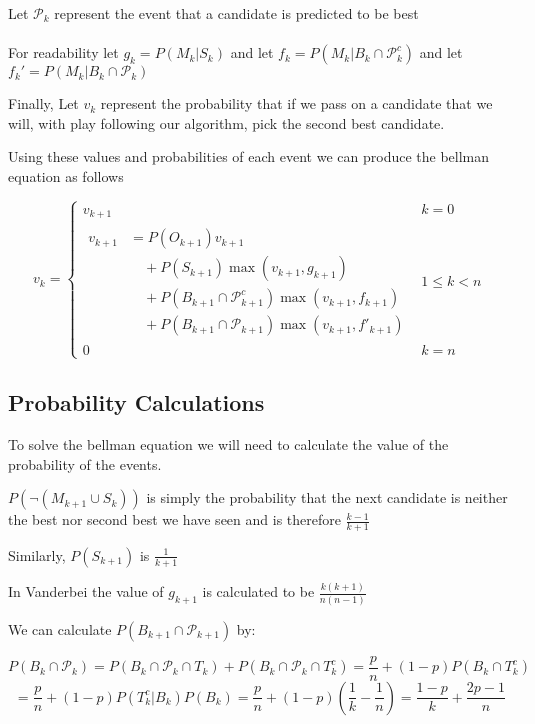 \documentclass[a4paper,11pt]{article}
\begin{document}
Let $\mathcal{P}_k$ represent the event that a candidate is predicted to be best\\ \\
For readability let $g_k = P(M_k|S_k)$ and let $f_k = P(M_k| B_k\cap \mathcal{P}^c_k )$ and let $f_k' = P(M_k|B_k\cap \mathcal{P}_k )$ 

Finally, Let $v_k$ represent the probability that if we pass on a candidate that we will, with play following our algorithm, pick the second best candidate.

Using these values and probabilities of each event we can produce the bellman equation as follows

$$
v_k = \begin{cases}
  v_{k+1} & k = 0\\
\begin{aligned}
v_{k+1} &= P(O_{k+1}) v_{k+1} \\
      &\quad + P(S_{k+1})\max\left(v_{k+1},g_{k+1}\right) \\
      &\quad + P(B_{k+1} \cap \mathcal{P}_{k+1}^c)\max\left(v_{k+1},f_{k+1}\right) \\
      &\quad + P(B_{k+1} \cap \mathcal{P}_{k+1})\max\left(v_{k+1},f'_{k+1}\right)
\end{aligned} & 1\le k < n\\
 0 & k = n
\end{cases}
$$

\subsection{Probability Calculations}

To solve the bellman equation we will need to calculate the value of the probability of the events.

$P(\neg(M_{k+1}\cup S_k))$ is simply the probability that the next candidate is neither the best nor second best we have seen and is therefore $\frac{k-1}{k+1}$

Similarly, $P(S_{k+1})$ is $\frac{1}{k+1}$

In Vanderbei the value of $g_{k+1}$ is calculated to be $\frac{k(k+1)}{n(n-1)}$

We can calculate $P(B_{k+1} \cap \mathcal{P}_{k+1})$ by:

$$
P(B_k \cap \mathcal{P}_k) = P(B_k \cap \mathcal{P}_k \cap T_k) + P(B_k \cap \mathcal{P}_k \cap T_k^c) = \frac{p}{n} + (1-p)P(B_k \cap T_k^c)
$$
$$
=\frac{p}{n} + (1-p)P(T_k^c|B_k)P(B_k) = \frac{p}{n} + (1-p)(\frac{1}{k}-\frac{1}{n}) = \frac{1-p}{k} + \frac{2p-1}{n}
$$ 
\end{document}
